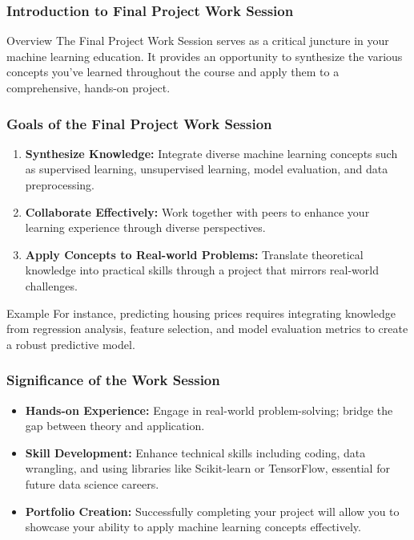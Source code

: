 \documentclass[aspectratio=169]{beamer}
\begin{document}
\frame{\titlepage}

\begin{frame}[fragile]
    \frametitle{Introduction to Final Project Work Session}
    \begin{block}{Overview}
        The Final Project Work Session serves as a critical juncture in your machine learning education. It provides an opportunity to synthesize the various concepts you've learned throughout the course and apply them to a comprehensive, hands-on project.
    \end{block}
\end{frame}

\begin{frame}[fragile]
    \frametitle{Goals of the Final Project Work Session}
    \begin{enumerate}
        \item \textbf{Synthesize Knowledge:} Integrate diverse machine learning concepts such as supervised learning, unsupervised learning, model evaluation, and data preprocessing.
        \item \textbf{Collaborate Effectively:} Work together with peers to enhance your learning experience through diverse perspectives.
        \item \textbf{Apply Concepts to Real-world Problems:} Translate theoretical knowledge into practical skills through a project that mirrors real-world challenges.
    \end{enumerate}
    
    \begin{block}{Example}
        For instance, predicting housing prices requires integrating knowledge from regression analysis, feature selection, and model evaluation metrics to create a robust predictive model.
    \end{block}
\end{frame}

\begin{frame}[fragile]
    \frametitle{Significance of the Work Session}
    \begin{itemize}
        \item \textbf{Hands-on Experience:} Engage in real-world problem-solving; bridge the gap between theory and application.
        \item \textbf{Skill Development:} Enhance technical skills including coding, data wrangling, and using libraries like Scikit-learn or TensorFlow, essential for future data science careers.
        \item \textbf{Portfolio Creation:} Successfully completing your project will allow you to showcase your ability to apply machine learning concepts effectively.
    \end{itemize}
\end{frame}
\end{document}
